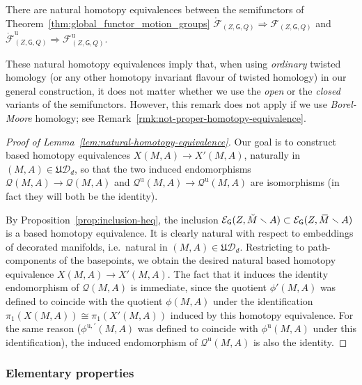\documentclass[AHL,Unicode,published]{cedram}
\newcommand{\Int}{\mathring}
\newcommand{\unt}{\mathrm{u}}
\newcommand{\mbar}{\ensuremath{{\,\,\overline{\!\! M\!}\,}}}
\newcommand{\fU}{\ensuremath{\mathfrak{U}}}
\newcommand{\sG}{\mathsf{G}}
\newcommand{\cD}{\mathcal{D}}
\newcommand{\cE}{\mathcal{E}}
\newcommand{\cF}{\mathcal{F}}
\newcommand{\cQ}{\mathcal{Q}}
\begin{document}
\begin{lemm}\label{lem:natural-homotopy-equivalence}
There are natural homotopy equivalences between the semifunctors of Theorem~\ref{thm:global_functor_motion_groups} $\Int{\cF}_{(Z,\sG,Q)} \Rightarrow \cF_{(Z,\sG,Q)}$ and $\Int{\cF}^{\unt}_{(Z,\sG,Q)}\Rightarrow \cF^{\unt}_{(Z,\sG,Q)}$.
\end{lemm}

\begin{rema}\label{rmk:invariance_F_open_closed}
These natural homotopy equivalences imply that, when using \emph{ordinary} twisted homology (or any other homotopy invariant flavour of twisted homology) in our general construction, it does not matter whether we use the \emph{open} or the \emph{closed} variants of the semifunctors. However, this remark does not apply if we use \emph{Borel-Moore} homology; see Remark~\ref{rmk:not-proper-homotopy-equivalence}.
\end{rema}

\begin{proof}[Proof of Lemma~\ref{lem:natural-homotopy-equivalence}]
Our goal is to construct based homotopy equivalences $X(M,A) \to X'(M,A)$, naturally in $(M,A) \in \fU\cD_{d}$, so that the two induced endomorphisms $\cQ(M,A) \to \cQ(M,A)$ and $\cQ^{\unt}(M,A) \to \cQ^{\unt}(M,A)$ are isomorphisms (in fact they will both be the identity).

By Proposition~\ref{prop:inclusion-heq}, the inclusion $\cE_{\sG}(Z,\Breve{M} \smallsetminus A) \subset \cE_{\sG}(Z,\mbar \smallsetminus A)$ is a based homotopy equivalence. It is clearly natural with respect to embeddings of decorated manifolds, i.e.~natural in $(M,A) \in \fU\cD_{d}$. Restricting to path-components of the basepoints, we obtain the desired natural based homotopy equivalence $X(M,A) \to X'(M,A)$. The fact that it induces the identity endomorphism of $\cQ(M,A)$ is immediate, since the quotient $\phi'(M,A)$ was defined to coincide with the quotient $\phi(M,A)$ under the identification $\pi_{1}(X(M,A)) \cong \pi_{1}(X'(M,A))$ induced by this homotopy equivalence. For the same reason ($\phi^{\unt,\prime}(M,A)$ was defined to coincide with $\phi^{\unt}(M,A)$ under this identification), the induced endomorphism of $\cQ^{\unt}(M,A)$ is also the identity.
\end{proof}


\subsubsection{Elementary properties}\label{sss:F-properties}
\end{document}

